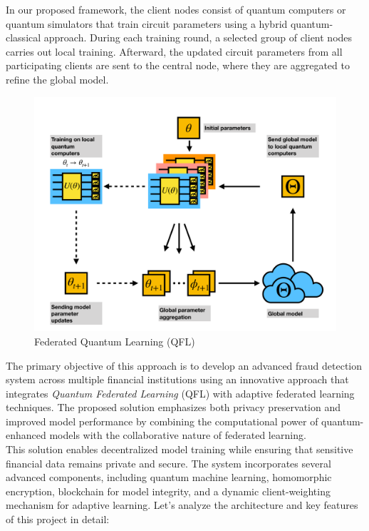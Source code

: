 \documentclass[10pt]{article}
\begin{document}
In our proposed framework, the client nodes consist of quantum computers or quantum simulators that train circuit parameters using a hybrid quantum-classical approach. During each training round, a selected group of client nodes carries out local training. Afterward, the updated circuit parameters from all participating clients are sent to the central node, where they are aggregated to refine the global model.
\begin{figure}[h!]
	\centering
	\includegraphics[height = 0.30\textheight]{img/QFL.png}
	\caption{Federated Quantum Learning (QFL)}
\end{figure}
The primary objective of this approach is to develop an advanced fraud detection system across multiple financial institutions using an innovative approach that integrates \textit{Quantum Federated Learning} (QFL) with adaptive federated learning techniques. The proposed solution emphasizes both privacy preservation and improved model performance by combining the computational power of quantum-enhanced models with the collaborative nature of federated learning.\\
This solution enables decentralized model training while ensuring that sensitive financial data remains private and secure. The system incorporates several advanced components, including quantum machine learning, homomorphic encryption, blockchain for model integrity, and a dynamic client-weighting mechanism for adaptive learning.
Let's analyze the architecture and key features of this project in detail:
\end{document}
